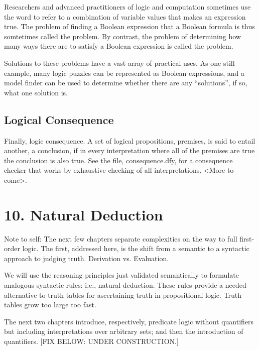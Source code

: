 \documentclass[letterpaper,10pt,english]{sphinxmanual}
\begin{document}
Researchers and advanced practitioners of logic and computation
sometimes use the word  to refer to a combination of variable
values that makes an expression true. The problem of finding a Boolean
expression that  a Boolean formula is thus somtetimes
called the  problem. By contrast, the problem of
determining how many ways there are to satisfy a Boolean expression is
called the  problem.

Solutions to these problems have a vast array of practical uses.  As
one still example, many logic puzzles can be represented as Boolean
expressions, and a model finder can be used to determine whether there
are any “solutions”, if so, what one solution is.


\section{Logical Consequence}
\label{\detokenize{09-propositional-logic:logical-consequence}}
Finally, logic consequence. A set of logical propositions, premises,
is said to entail another, a conclusion, if in every interpretation
where all of the premises are true the conclusion is also true. See
the file, consequence.dfy, for a consequence checker that works by
exhaustive checking of all interpretations. \textless{}More to come\textgreater{}.


\chapter{10. Natural Deduction}
\label{\detokenize{10-natural-deduction:natural-deduction}}\label{\detokenize{10-natural-deduction::doc}}
Note to self: The next few chapters separate complexities on the way
to full first-order logic. The first, addressed here, is the shift
from a semantic to a syntactic approach to judging truth. Derivation
vs. Evaluation.

We will use the reasoning principles just validated semantically to
formulate analogous syntactic rules: i.e., natural deduction. These
rules provide a needed alternative to truth tables for ascertaining
truth in propositional logic. Truth tables grow too large too fast.

The next two chapters introduce, respectively, predicate logic without
quantifiers but including interpretations over arbitrary sets; and then
the introduction of quantifiers.
{[}FIX BELOW: UNDER CONSTRUCTION.{]}
\end{document}
